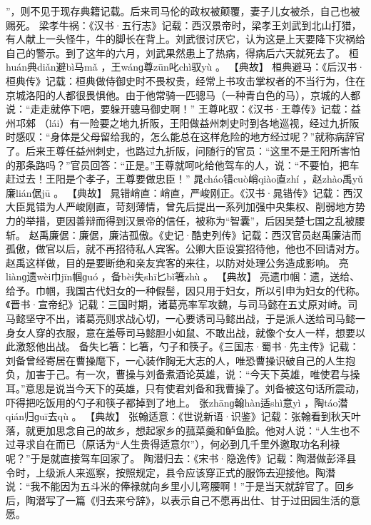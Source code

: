 \documentclass[12pt,UTF8]{ctexbook}
\begin{document}
”，则不见于现存典籍记载。后来司马伦的政权被颠覆，妻子儿女被杀，自己也被赐死。
梁孝牛祸：《汉书·五行志》记载：西汉景帝时，梁孝王刘武到北山打猎，有人献上一头怪牛，牛的脚长在背上。刘武很讨厌它，认为这是上天要降下灾祸给自己的警示。到了这年的六月，刘武果然患上了热病，得病后六天就死去了。
桓huán典diǎn避bì马mǎ
，王wánɡ尊zūn叱chì驭yù
。
【典故】
桓典避马：《后汉书·桓典传》记载：桓典做侍御史时不畏权贵，经常上书攻击掌权者的不当行为，住在京城洛阳的人都很畏惧他。由于他常骑一匹骢马（一种青白色的马），京城的人都说：“走走就停下吧，要躲开骢马御史啊！”
王尊叱驭：《汉书·王尊传》记载：益州邛郲 （lái）有一险要之地九折阪，王阳做益州刺史时到各地巡视，经过九折阪时感叹：“身体是父母留给我的，怎么能总在这样危险的地方经过呢？”就称病辞官了。后来王尊任益州刺史，也路过九折阪，问随行的官员：“这里不是王阳所害怕的那条路吗？”官员回答：“正是。”王尊就呵叱给他驾车的人，说：“不要怕，把车赶过去！王阳是个孝子，王尊要做忠臣！”
晁cháo错cuò峭qiào直zhí
，赵zhào禹yǔ廉lián倨jū
。
【典故】
晁错峭直：峭直，严峻刚正。《汉书·晁错传》记载：西汉大臣晁错为人严峻刚直，苛刻薄情，曾先后提出一系列加强中央集权、削弱地方势力的举措，更因善辩而得到汉景帝的信任，被称为“智囊”，后因吴楚七国之乱被腰斩。
赵禹廉倨：廉倨，廉洁孤傲。《史记·酷吏列传》记载：西汉官员赵禹廉洁而孤傲，做官以后，就不再招待私人宾客。公卿大臣设宴招待他，他也不回请对方。赵禹这样做，目的是要断绝和亲友宾客的来往，以防对处理公务造成影响。
亮liànɡ遗wèi巾jīn帼ɡuó
，备bèi失shī匕bǐ箸zhù
。
【典故】
亮遗巾帼：遗，送给、给予。巾帼，我国古代妇女的一种假髻，因只用于妇女，所以引申为妇女的代称。《晋书·宣帝纪》记载：三国时期，诸葛亮率军攻魏，与司马懿在五丈原对峙。司马懿坚守不出，诸葛亮则求战心切，一心要诱司马懿出战，于是派人送给司马懿一身女人穿的衣服，意在羞辱司马懿胆小如鼠、不敢出战，就像个女人一样，想要以此激怒他出战。
备失匕箸：匕箸，勺子和筷子。《三国志·蜀书·先主传》记载：刘备曾经寄居在曹操麾下，一心装作胸无大志的人，唯恐曹操识破自己的人生抱负，加害于己。有一次，曹操与刘备煮酒论英雄，说：“今天下英雄，唯使君与操耳。”意思是说当今天下的英雄，只有使君刘备和我曹操了。刘备被这句话所震动，吓得把吃饭用的勺子和筷子都掉到了地上。
张zhānɡ翰hàn适shì意yì
，陶táo潜qián归ɡuī去qù
。
【典故】
张翰适意：《世说新语·识鉴》记载：张翰看到秋天叶落，就更加思念自己的故乡，想起家乡的菰菜羹和鲈鱼脍。他对人说：“人生也不过寻求自在而已（原话为“人生贵得适意尔”），何必到几千里外邀取功名利禄呢？”于是就直接驾车回家了。
陶潜归去：《宋书·隐逸传》记载：陶潜做彭泽县令时，上级派人来巡察，按照规定，县令应该穿正式的服饰去迎接他。陶潜说：“我不能因为五斗米的俸禄就向乡里小儿弯腰啊！”于是当天就辞官了。回乡后，陶潜写了一篇《归去来兮辞》，以表示自己不愿再出仕、甘于过田园生活的意愿。
\end{document}
